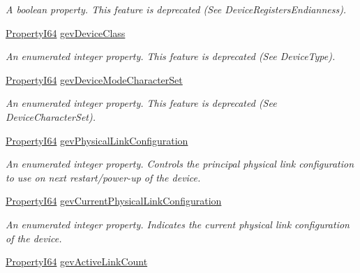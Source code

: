 \begin{DoxyCompactItemize}
\begin{DoxyCompactList}\small\item\em A boolean property. This feature is deprecated (See Device\+Registers\+Endianness). \end{DoxyCompactList}\item 
\hyperlink{group___common_interface_ga81749b2696755513663492664a18a893}{Property\+I64} \hyperlink{classmv_i_m_p_a_c_t_1_1acquire_1_1_gen_i_cam_1_1_transport_layer_control_ae45e57b8dbf5f7326d7821b34ca5b937}{gev\+Device\+Class}
\begin{DoxyCompactList}\small\item\em An enumerated integer property. This feature is deprecated (See Device\+Type). \end{DoxyCompactList}\item 
\hyperlink{group___common_interface_ga81749b2696755513663492664a18a893}{Property\+I64} \hyperlink{classmv_i_m_p_a_c_t_1_1acquire_1_1_gen_i_cam_1_1_transport_layer_control_a78dd1674e999f062707bf819a570168a}{gev\+Device\+Mode\+Character\+Set}
\begin{DoxyCompactList}\small\item\em An enumerated integer property. This feature is deprecated (See Device\+Character\+Set). \end{DoxyCompactList}\item 
\hyperlink{group___common_interface_ga81749b2696755513663492664a18a893}{Property\+I64} \hyperlink{classmv_i_m_p_a_c_t_1_1acquire_1_1_gen_i_cam_1_1_transport_layer_control_a1d04272869b5fb01e6d619dd98cfddd0}{gev\+Physical\+Link\+Configuration}
\begin{DoxyCompactList}\small\item\em An enumerated integer property. Controls the principal physical link configuration to use on next restart/power-\/up of the device. \end{DoxyCompactList}\item 
\hyperlink{group___common_interface_ga81749b2696755513663492664a18a893}{Property\+I64} \hyperlink{classmv_i_m_p_a_c_t_1_1acquire_1_1_gen_i_cam_1_1_transport_layer_control_a39076276bc40bcfbbf3f47be94d09987}{gev\+Current\+Physical\+Link\+Configuration}
\begin{DoxyCompactList}\small\item\em An enumerated integer property. Indicates the current physical link configuration of the device. \end{DoxyCompactList}\item 
\hyperlink{group___common_interface_ga81749b2696755513663492664a18a893}{Property\+I64} \hyperlink{classmv_i_m_p_a_c_t_1_1acquire_1_1_gen_i_cam_1_1_transport_layer_control_a1809ad4c80d86c2e1a271b2b699bd58d}{gev\+Active\+Link\+Count}

\end{DoxyCompactItemize}
